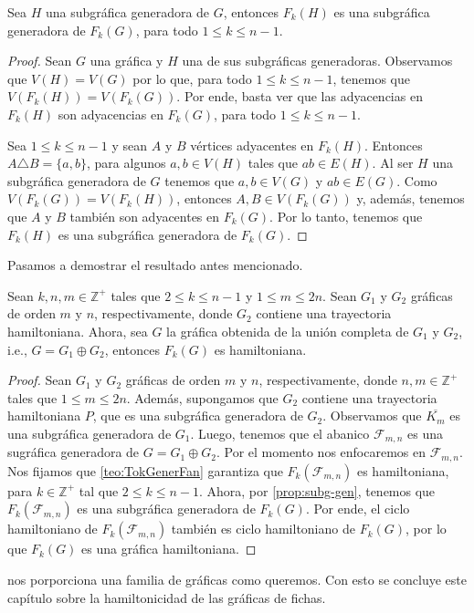 \begin{proposicion}
\label{prop:subg-gen}
    Sea $H$ una subgr\'afica generadora de $G$, entonces $F_k(H)$ es una
    subgr\'afica generadora de $F_k(G)$, para todo $1 \leq k \leq n-1$.
\end{proposicion}

\begin{proof}
    Sean $G$ una gr\'afica y $H$ una de sus subgr\'aficas generadoras.
    Observamos que $V(H)=V(G)$ por lo que, para todo $1 \leq k \leq n-1$,
    tenemos que $V(F_k(H))=V(F_k(G))$. Por ende, basta ver que las adyacencias
    en $F_k(H)$ son adyacencias en $F_k(G)$, para todo $1 \leq k \leq n-1$.

    Sea $1 \leq k \leq n-1$ y sean $A$ y $B$ v\'ertices adyacentes en $F_k(H)$.
    Entonces $ A \triangle B = \{a,b\}$, para algunos $a,b \in V(H)$ tales que
    $ab \in E(H)$. Al ser $H$ una subgr\'afica generadora de $G$ tenemos que
    $a,b \in V(G)$ y $ab \in E(G)$. Como $V(F_k(G))=V(F_k(H))$, entonces $A,B
    \in V(F_k(G))$ y, adem\'as, tenemos que $A$ y $B$ tambi\'en son adyacentes
    en $F_k(G)$. Por lo tanto, tenemos que $F_k(H)$ es una subgr\'afica
    generadora de $F_k(G)$.
\end{proof}

Pasamos a demostrar el resultado antes mencionado.

\begin{corolario}
\label{coro:Token-Join}
    Sean $k,n,m \in \mathbb{Z^{+}}$ tales que $2 \leq k \leq n-1$ y $1 \leq m
    \leq 2n$. Sean $G_1$ y $G_2$ gr\'aficas de orden $m$ y $n$, respectivamente,
    donde $G_2$ contiene una trayectoria hamiltoniana. Ahora, sea $G$ la
    gr\'afica obtenida de la uni\'on completa de $G_1$ y $G_2$, i.e., $G = G_1
    \oplus G_2$, entonces $F_k(G)$ es hamiltoniana. 
\end{corolario}

\begin{proof}
    Sean $G_1$ y $G_2$ gr\'aficas de orden $m$ y $n$, respectivamente, donde
    $n,m \in \mathbb{Z^{+}}$ tales que $1 \leq m \leq 2n$. Adem\'as, supongamos
    que $G_2$ contiene una trayectoria hamiltoniana $P$, que es una subgr\'afica
    generadora de $G_2$. Observamos que $\overline{K_m}$ es una subgr\'afica
    generadora de $G_1$. Luego, tenemos que el abanico $\mathcal{F}_{m,n}$ es
    una sugr\'afica generadora de $G= G_1 \oplus G_2$. Por el momento nos
    enfocaremos en $\mathcal{F}_{m,n}$. Nos fijamos que \cref{teo:TokGenerFan}
    garantiza que $F_k(\mathcal{F}_{m,n})$ es hamiltoniana, para $k \in
    \mathbb{Z^{+}}$ tal que $2 \leq k \leq n-1$. Ahora, por
    \cref{prop:subg-gen}, tenemos que $F_k(\mathcal{F}_{m,n})$ es una
    subgr\'afica generadora de $F_k(G)$. Por ende, el ciclo hamiltoniano de
    $F_k(\mathcal{F}_{m,n})$ tambi\'en es ciclo hamiltoniano de $F_k(G)$, por lo
    que $F_k(G)$ es una gr\'afica hamiltoniana.
\end{proof}

 nos porporciona una familia de gr\'aficas como queremos.
Con esto se concluye este cap\'itulo sobre la hamiltonicidad de las gr\'aficas
de fichas.
